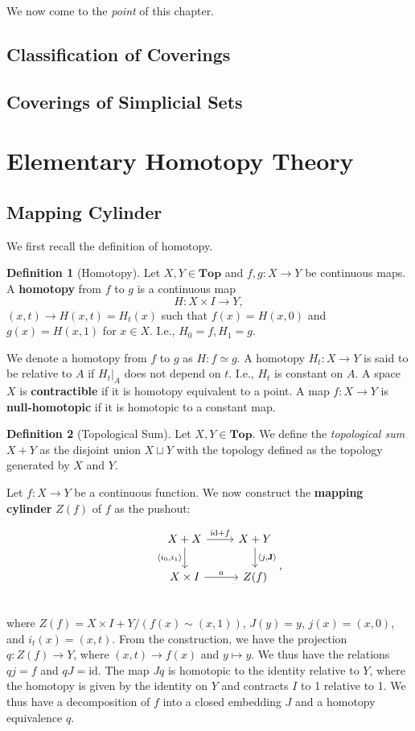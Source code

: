 \documentclass{article}
\theoremstyle{definition}
\newtheorem{defn}{Definition}[section]
\newcommand{\cat}{\mathbf}
\begin{document}
We now come to the \textit{point} of this chapter.
\subsection{Classification of Coverings}
\subsection{Coverings of Simplicial Sets}

\section{Elementary Homotopy Theory}
\subsection{Mapping Cylinder}
We first recall the definition of homotopy.
\begin{defn}[Homotopy]
Let $X,Y\in\cat{Top}$ and $f,g:X\rightarrow Y$ be continuous maps. A \textbf{homotopy} from $f$ to $g$ is a continuous map
\[H:X\times I\rightarrow Y,\] $(x,t)\rightarrow H(x,t)=H_{t}(x)$ such that $f(x)=H(x,0)$ and $g(x)=H(x,1)$ for $x\in X$. I.e., $H_{0}=f,H_{1}=g.$
\end{defn}
We denote a homotopy from $f$ to $g$ as $H:f\simeq g.$ A homotopy $H_{t}:X\rightarrow Y$ is said to be relative to $A$ if $H_{t}|_{A}$ does not depend on $t$. I.e., $H_{t}$ is constant on $A$. A space $X$ is \textbf{contractible} if it is homotopy equivalent to a point. A map $f:X\rightarrow Y$ is \textbf{null-homotopic} if it is homotopic to a constant map. 
\begin{defn}[Topological Sum]
Let $X,Y\in\cat{Top}$. We define the \textit{topological sum} $X+Y$ as the disjoint union $X\sqcup Y$ with the topology defined as the topology generated by $X$ and $Y$.
\end{defn}
Let $f:X\rightarrow Y$ be a continuous function. We now construct the \textbf{mapping cylinder} $Z(f)$ of $f$ as the pushout:

\[
\begin{tikzcd}
&X+X \arrow[r,"\text{id}+f"] \arrow[d,"\langle{i_{0},i_{1}}\rangle"'] &X+Y\arrow[d,"\langle{j,\mathbf{J}}\rangle"]\\
&X\times I\arrow[r,"a"] &Z(f)\\
\end{tikzcd}
,\]
where $Z(f)=X\times I+Y/(f(x)\sim(x,1))$, $J(y)=y$, $j(x)=(x,0)$, and $i_{t}(x)=(x,t).$ From the construction, we have the projection $q:Z(f)\rightarrow Y$, where $(x,t)\rightarrow f(x)$ and $y\mapsto y$. We thus have the relations $qj=f$ and $qJ=\text{id}$. The map $Jq$ is homotopic to the identity relative to $Y$, where the homotopy is given by the identity on $Y$ and contracts $I$ to 1 relative to 1. We thus have a decomposition of $f$ into a closed embedding $J$ and a homotopy equivalence $q$.
\end{document}
